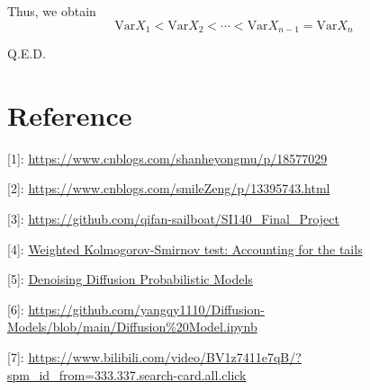 \documentclass[11pt]{article}
\begin{document}
Thus, we obtain
\[
\text{Var} X_1 < \text{Var} X_2 < \cdots < \text{Var} X_{n-1} = \text{Var} X_n
\]

Q.E.D.

    \section*{Reference}\label{reference}

{[}1{]}: \url{https://www.cnblogs.com/shanheyongmu/p/18577029}

{[}2{]}: \url{https://www.cnblogs.com/smileZeng/p/13395743.html}

{[}3{]}: \url{https://github.com/qifan-sailboat/SI140_Final_Project}

{[}4{]}: \href{https://arxiv.org/abs/1207.7308}{Weighted
Kolmogorov-Smirnov test: Accounting for the tails}

{[}5{]}: \href{https://arxiv.org/abs/2006.11239}{Denoising Diffusion
Probabilistic Models}

{[}6{]}: \url{https://github.com/yangqy1110/Diffusion-Models/blob/main/Diffusion\%20Model.ipynb}

{[}7{]}: \url{https://www.bilibili.com/video/BV1z7411e7qB/?spm_id_from=333.337.search-card.all.click}


    
    
    
\end{document}
